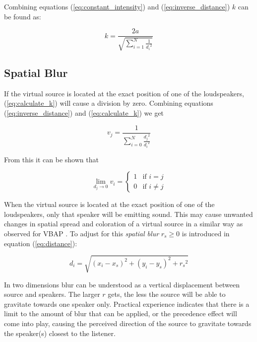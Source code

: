 \documentclass[twoside,10pt]{article}
\begin{document}
Combining equations (\ref{eq:constant_intensity}) and (\ref{eq:inverse_distance}) $k$ can be found as:

\begin{equation} \label{eq:calculate_k}
k = \frac{2a}{\sqrt{\sum_{i=1}^{N} \frac{1}{{d_{i}}^2}}}
\end{equation}




\subsection{Spatial Blur}

If the virtual source is located at the exact position of one of the loudspeakers, (\ref{eq:calculate_k}) will cause a division by zero. Combining equations (\ref{eq:inverse_distance}) and (\ref{eq:calculate_k}) we get

\begin{equation}
v_{j} = \frac{1}{\sum_{i=0}^{N} \frac{{d_{j}}^2}{{d_{i}}^2}}
\end{equation}

From this it can be shown that

\begin{equation} \label{eq:distance_zero}
\lim_{d_{j} \rightarrow 0} v_{i} = 
\left\{ \begin{array}{ll} 
1 & \textrm{if $i=j$}\\ 
0 & \textrm{if $i \ne j$}
\end{array} \right.
\end{equation}

When the virtual source is located at the exact position of one of the loudspeakers, only that speaker will be emitting sound. This may cause unwanted changes in spatial spread and coloration of a virtual source in a similar way as observed for VBAP \cite{Pulkki:1999vbap}. To adjust for this \textit{spatial blur} $r_{s} \ge 0$ is introduced in equation (\ref{eq:distance}):

\begin{equation} \label{eq:mod_distance}
d_{i} = \sqrt{ {(x_{i} - x_{s})}^2 + {(y_{i} - y_{s})}^2 + {r_{s}}^2}
\end{equation}

In two dimensions blur can be understood as a vertical displacement between source and speakers. The larger $r$ gets, the less the source will be able to gravitate towards one speaker only. Practical experience indicates that there is a limit to the amount of blur that can be applied, or the precedence effect \cite{Litovsky:1999precedence_effect} will come into play, causing the perceived direction of the source to gravitate towards the speaker(s) closest to the listener.
\end{document}
